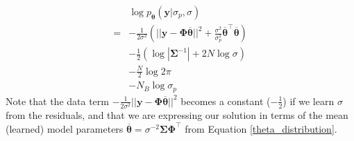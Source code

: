 \documentclass{article}
\begin{document}
\begin{equation}
\label{eq:log_likelihood_BLR}
\begin{split}
    &\log p_{\boldsymbol{\theta}}(\mathbf{y}|\sigma_p, \sigma) \\=&- \frac{1}{2\sigma^2}\left(||\mathbf{y}-\boldsymbol{\Phi}\overline{\boldsymbol{\theta}}||^2 + \frac{\sigma^2}{\sigma_p^2}\overline{\boldsymbol{\theta}}^\top\overline{\boldsymbol{\theta}}\right) \\&-\frac{1}{2}\left( \log|\boldsymbol{\Sigma}^{-1}|+2 N \log \sigma\right)\\&-\frac{N}{2}\log 2\pi \\& -N_B \log \sigma_p 
    \end{split}
\end{equation}Note that the data term $- \frac{1}{2\sigma^2}||\mathbf{y}-\boldsymbol{\Phi}\overline{\boldsymbol{\theta}}||^2 $ becomes a constant ($-\frac{1}{2}$) if we learn $\sigma$ from the residuals, and that we are expressing our solution in terms of the mean (learned) model parameters $\overline{\boldsymbol{\theta}}=\sigma^{-2}\boldsymbol{\Sigma}\boldsymbol{\Phi}^\top$ from Equation \ref{theta_distribution}.
\end{document}
